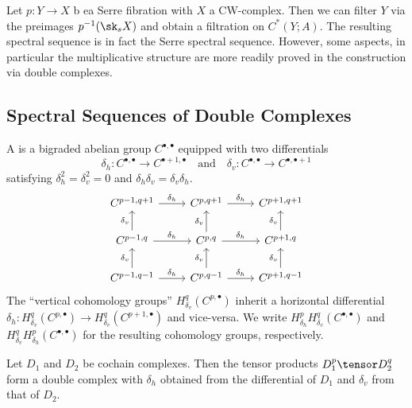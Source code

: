 \begin{example}
	Let $p\colon Y \to X$ b ea Serre fibration with $X$ a CW-complex.
	Then we can filter $Y$ via the preimages $p^{-1}(\sk_s X)$ and obtain a filtration on $C^*(Y; A)$.
	The resulting spectral sequence is in fact the Serre spectral sequence.
	However, some aspects, in particular the multiplicative structure are more readily proved in the construction via double complexes.
\end{example}
\subsection{Spectral Sequences of Double Complexes}
\begin{definition}
	A  is a bigraded abelian group $C^{\bullet, \bullet}$ equipped with two differentials
	\begin{equation*}
		\delta_h\colon C^{\bullet, \bullet} \to C^{\bullet + 1, \bullet} \quad\text{and}\quad \delta_v\colon C^{\bullet, \bullet} \to C^{\bullet, \bullet + 1}
	\end{equation*}
	satisfying $\delta_h^2 = \delta_v^2 = 0$ and $\delta_h \delta_v = \delta_v \delta_h$.
	\begin{equation*}
		\begin{tikzcd}
			C^{p - 1, q + 1}
					\ar[r, "\delta_h"]
				& C^{p, q + 1}
					\ar[r, "\delta_h"]
				& C^{p + 1, q + 1}
			\\
			C^{p - 1, q}
					\ar[r, "\delta_h"]
					\ar[u, "\delta_v"]
				& C^{p, q}
					\ar[r, "\delta_h"]
					\ar[u, "\delta_v"]
				& C^{p + 1, q}
					\ar[u, "\delta_v"]
			\\
			C^{p - 1, q - 1}
					\ar[r, "\delta_h"]
					\ar[u, "\delta_v"]
				& C^{p, q - 1}
					\ar[r, "\delta_h"]
					\ar[u, "\delta_v"]
				& C^{p + 1, q - 1}
					\ar[u, "\delta_v"]
		\end{tikzcd}
	\end{equation*}
	The \enquote{vertical cohomology groups} $H^q_{\delta_v}(C^{p, \bullet})$ inherit a horizontal differential $\delta_h\colon H^q_{\delta_v}(C^{p, \bullet}) \to H^q_{\delta_v}(C^{p + 1, \bullet})$ and vice-versa.
	We write $H_{\delta_h}^p H_{\delta_v}^q(C^{\bullet, \bullet})$ and $H_{\delta_v}^q H_{\delta_h}^p(C^{\bullet, \bullet})$ for the resulting cohomology groups, respectively.
\end{definition}
\begin{example}
	Let $D_1$ and $D_2$ be cochain complexes. 
	Then the tensor products $D_1^p \tensor D_2^q$ form a double complex with $\delta_h$ obtained from the differential of $D_1$ and $\delta_v$ from that of $D_2$.
\end{example}
